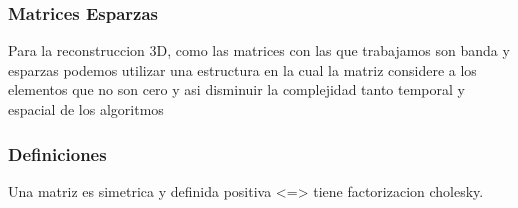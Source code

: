\subsubsection{Matrices Esparzas}
Para la reconstruccion 3D, como las matrices con las que trabajamos son banda y esparzas podemos utilizar una estructura en la cual la matriz considere a los elementos que no son cero y asi disminuir la complejidad tanto temporal y espacial de los algoritmos 

\subsubsection{Definiciones}
Una matriz es simetrica y definida positiva <=> tiene factorizacion cholesky.


